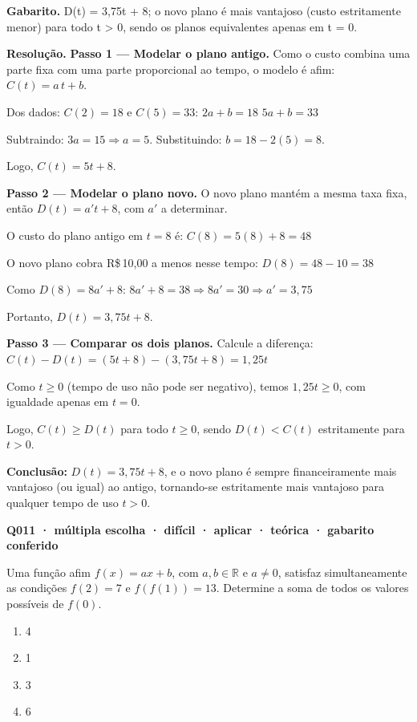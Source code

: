 \documentclass[11pt,a4paper]{article}
\begin{document}
\textbf{Gabarito.} D(t) = 3,75t + 8; o novo plano é mais vantajoso (custo estritamente menor) para todo t > 0, sendo os planos equivalentes apenas em t = 0.

\textbf{Resolução.} \textbf{Passo 1 — Modelar o plano antigo.}
Como o custo combina uma parte fixa com uma parte proporcional ao tempo, o modelo é afim: $C(t) = a\,t + b$.

Dos dados: $C(2)=18$ e $C(5)=33$:
$2a+b=18$
$5a+b=33$

Subtraindo: $3a=15 \Rightarrow a=5$. Substituindo: $b = 18-2(5)=8$.

Logo, $C(t) = 5t+8$.

\textbf{Passo 2 — Modelar o plano novo.}
O novo plano mantém a mesma taxa fixa, então $D(t) = a't + 8$, com $a'$ a determinar.

O custo do plano antigo em $t=8$ é:
$C(8) = 5(8)+8 = 48$

O novo plano cobra R\$\,10,00 a menos nesse tempo:
$D(8) = 48-10 = 38$

Como $D(8) = 8a'+8$:
$8a'+8 = 38 \Rightarrow 8a' = 30 \Rightarrow a' = 3{,}75$

Portanto, $D(t) = 3{,}75t + 8$.

\textbf{Passo 3 — Comparar os dois planos.}
Calcule a diferença:
$C(t)-D(t) = (5t+8)-(3{,}75t+8) = 1{,}25t$

Como $t \geq 0$ (tempo de uso não pode ser negativo), temos $1{,}25t \geq 0$, com igualdade apenas em $t=0$.

Logo, $C(t) \geq D(t)$ para todo $t\geq 0$, sendo $D(t) < C(t)$ estritamente para $t>0$.

\textbf{Conclusão:} $D(t) = 3{,}75t+8$, e o novo plano é sempre financeiramente mais vantajoso (ou igual) ao antigo, tornando-se estritamente mais vantajoso para qualquer tempo de uso $t>0$.

\bigskip\noindent\textbf{Q011 · múltipla escolha · difícil · aplicar · teórica · gabarito conferido}\par\nopagebreak
Uma função afim $f(x) = ax + b$, com $a, b \in \mathbb{R}$ e $a \neq 0$, satisfaz simultaneamente as condições $f(2) = 7$ e $f(f(1)) = 13$. Determine a soma de todos os valores possíveis de $f(0)$.
\begin{enumerate}[label=(\alph*)]
\item 4
\item 1
\item 3
\item 6
\end{enumerate}
\end{document}
